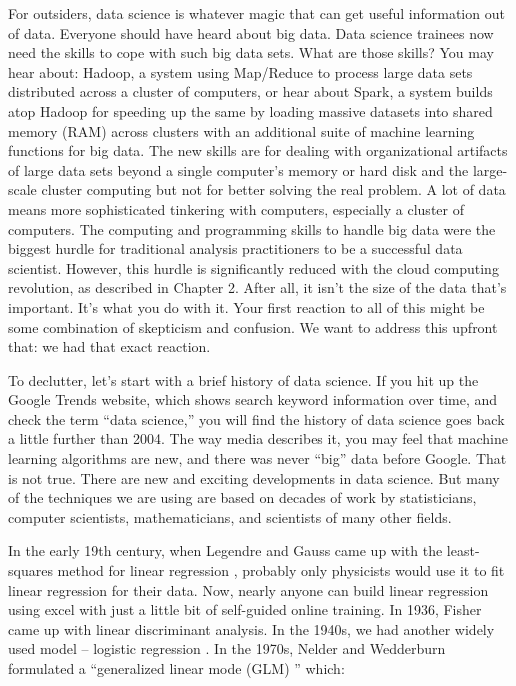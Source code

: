 \documentclass[
  12pt,
]{krantz}
\begin{document}
For outsiders, data science is whatever magic that can get useful information out of data. Everyone should have heard about big data. Data science trainees now need the skills to cope with such big data sets. What are those skills? You may hear about: Hadoop, a system using Map/Reduce to process large data sets distributed across a cluster of computers, or hear about Spark, a system builds atop Hadoop for speeding up the same by loading massive datasets into shared memory (RAM) across clusters with an additional suite of machine learning functions for big data. The new skills are for dealing with organizational artifacts of large data sets beyond a single computer's memory or hard disk and the large-scale cluster computing but not for better solving the real problem. A lot of data means more sophisticated tinkering with computers, especially a cluster of computers. The computing and programming skills to handle big data were the biggest hurdle for traditional analysis practitioners to be a successful data scientist. However, this hurdle is significantly reduced with the cloud computing revolution, as described in Chapter 2. After all, it isn't the size of the data that's important. It's what you do with it. Your first reaction to all of this might be some combination of skepticism and confusion. We want to address this upfront that: we had that exact reaction.

To declutter, let's start with a brief history of data science. If you hit up the Google Trends website, which shows search keyword information over time, and check the term ``data science,'' you will find the history of data science goes back a little further than 2004. The way media describes it, you may feel that machine learning algorithms are new, and there was never ``big'' data before Google. That is not true. There are new and exciting developments in data science. But many of the techniques we are using are based on decades of work by statisticians, computer scientists, mathematicians, and scientists of many other fields.

In the early 19th century, when Legendre and Gauss came up with the least-squares method for linear regression , probably only physicists would use it to fit linear regression for their data. Now, nearly anyone can build linear regression using excel with just a little bit of self-guided online training. In 1936, Fisher came up with linear discriminant analysis. In the 1940s, we had another widely used model -- logistic regression . In the 1970s, Nelder and Wedderburn formulated a ``generalized linear mode (GLM)  '' which:
\end{document}
